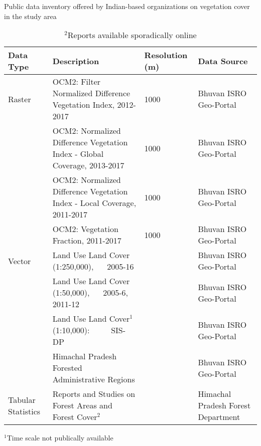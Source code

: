 \begin{table}[H]
	\small
	\def\arraystretch{1.6}
	\begin{threeparttable}
		\centering
		\caption{Public data inventory offered by Indian-based organizations on vegetation cover in the study area}
		\label{table3}
		\begin{tabular}{L{2cm} L{6.3cm} L{1.9cm} L{4.1cm}}
			\toprule[0.25mm]
			Data Type & Description & Resolution (m) & Data Source \\
			\midrule[0.35mm]
			Raster  & OCM2: Filter Normalized Difference Vegetation Index, 2012-2017 & 1000 & Bhuvan ISRO Geo-Portal \\
			& OCM2: Normalized Difference Vegetation Index - Global Coverage, 2013-2017 & 1000 & Bhuvan ISRO Geo-Portal \\
			& OCM2: Normalized Difference Vegetation Index - Local Coverage, 2011-2017 & 1000 & Bhuvan ISRO Geo-Portal \\
			& OCM2: Vegetation Fraction, 2011-2017 & 1000 & Bhuvan ISRO Geo-Portal \\[0.3cm]
			Vector & Land Use Land Cover (1:250,000), ~~ 2005-16 & \bfseries \textemdash \rm & Bhuvan ISRO Geo-Portal\\
			& Land Use Land Cover (1:50,000), ~~ 2005-6, 2011-12 & \bfseries \textemdash \rm & Bhuvan ISRO Geo-Portal \\
			& Land Use Land Cover$^{1}$ (1:10,000): ~~~~ SIS-DP & \bfseries \textemdash \rm & Bhuvan ISRO Geo-Portal \\
			& Himachal Pradesh Forested Administrative Regions& \bfseries \textemdash \rm & Bhuvan ISRO Geo-Portal \\[0.7cm]
			Tabular Statistics & Reports and Studies on Forest Areas and Forest Cover$^2$ & \bfseries \textemdash \rm & Himachal Pradesh Forest Department  \\
			\bottomrule[0.25mm]
		\end{tabular}
		\caption*{$^1$Time scale not publically available} \vspace{-5pt}
		\caption*{$^2$Reports available sporadically online}
	\end{threeparttable}
\end{table}
\vspace{-25pt}

